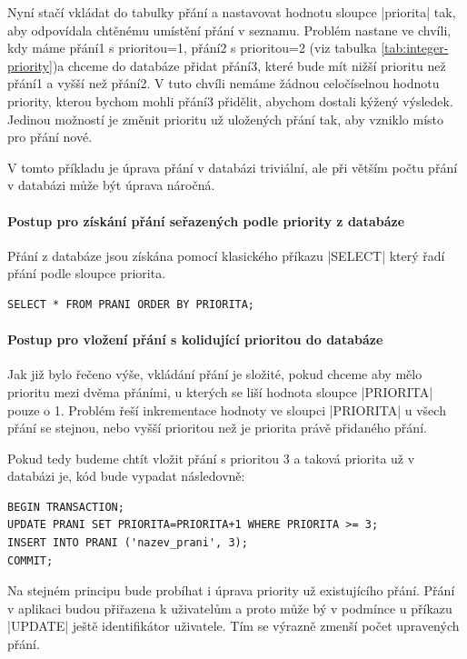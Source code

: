 Nyní stačí vkládat do tabulky přání a nastavovat hodnotu sloupce |priorita| tak, aby odpovídala chtěnému umístění přání v seznamu. Problém nastane ve chvíli, kdy máme přání1 s prioritou=1, přání2 s prioritou=2 (viz tabulka \ref{tab:integer-priority})a chceme do databáze přidat přání3, které bude mít nižší prioritu než přání1 a vyšší než přání2. V tuto chvíli nemáme žádnou celočíselnou hodnotu priority, kterou bychom mohli přání3 přidělit, abychom dostali kýžený výsledek. Jedinou možností je změnit prioritu už uložených přání tak, aby vzniklo místo pro přání nové.

V tomto příkladu je úprava přání v databázi triviální, ale při větším počtu přání v databázi může být úprava náročná.

\paragraph{Postup pro získání přání seřazených podle priority z databáze}
Přání z databáze jsou získána pomocí klasického příkazu |SELECT| který řadí přání podle sloupce priorita.

\lstset{language=SQL, style=custom} 
\begin{lstlisting}
SELECT * FROM PRANI ORDER BY PRIORITA;
\end{lstlisting}

\paragraph{Postup pro vložení přání s kolidující prioritou do databáze}
Jak již bylo řečeno výše, vkládání přání je složité, pokud chceme aby mělo prioritu mezi dvěma přáními, u kterých se liší hodnota sloupce |PRIORITA| pouze o 1. Problém řeší inkrementace hodnoty ve sloupci |PRIORITA| u všech přání se stejnou, nebo vyšší prioritou než je priorita právě přidaného přání.

Pokud tedy budeme chtít vložit přání s prioritou 3 a taková priorita už v databázi je, kód bude vypadat následovně:

\begin{lstlisting}
BEGIN TRANSACTION;
UPDATE PRANI SET PRIORITA=PRIORITA+1 WHERE PRIORITA >= 3;
INSERT INTO PRANI ('nazev_prani', 3);
COMMIT;
\end{lstlisting}

Na stejném principu bude probíhat i úprava priority už existujícího přání. Přání v aplikaci budou přiřazena k uživatelům a proto může bý v podmínce u příkazu |UPDATE| ještě identifikátor uživatele. Tím se výrazně zmenší počet upravených přání.

